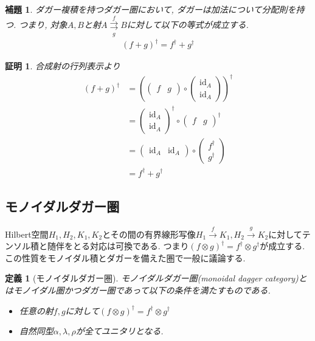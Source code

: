 \documentclass[a4paper,12pt]{ltjsarticle}
\theoremstyle{break}
\newtheorem{defn}[thm]{定義}
\newtheorem{lem}[thm]{補題}
\newtheorem*{prf}{証明}
\newcommand{\xr}[1]{\xrightarrow{#1}}
\newcommand{\id}{\mathrm{id}}
\newcommand{\ci}{\circ}
\newcommand{\al}{\alpha}
\newcommand{\la}{\lambda}
\newcommand{\da}{\dagger}
\newcommand{\ot}{\otimes}
\numberwithin{equation}{section}
\begin{document}
\begin{lem}
  ダガー複積を持つダガー圏において, ダガーは加法について分配則を持つ. 
  つまり, 対象$A,B$と射$A \overset{f}{\underset{g}{\rightrightarrows}} B$に対して以下の等式が成立する.
  \begin{align*}
    (f+g)^\da = f^\da + g^\da
  \end{align*}
\end{lem}

\begin{prf}
  合成射の行列表示より
  \begin{align*}
    (f+g)^\da
    &= \left( 
      \begin{pmatrix}
      f & g
    \end{pmatrix} \ci 
    \begin{pmatrix}
      \id_A \\
      \id_A
    \end{pmatrix}\right)^\da \\
    &= \begin{pmatrix}
      \id_A \\
      \id_A
    \end{pmatrix}^\da
    \ci \begin{pmatrix}
      f & g
    \end{pmatrix}^\da \\
    &= \begin{pmatrix}
      \id_A & \id_A
    \end{pmatrix} \ci 
    \begin{pmatrix}
      f^\da \\
      g^\da
    \end{pmatrix} \\
    &= f^\da + g^\da
  \end{align*}
\end{prf}

\subsection{モノイダルダガー圏}

Hilbert空間$H_1,H_2,K_1,K_2$とその間の有界線形写像$H_1 \xr{f} K_1, H_2 \xr{g} K_2$に対してテンソル積と随伴をとる対応は可換である. 
つまり$(f \ot g)^\da = f^\da \ot g^\da$が成立する. 
この性質をモノイダル積とダガーを備えた圏で一般に議論する. 

\begin{defn}[モノイダルダガー圏]
  モノイダルダガー圏(monoidal dagger category)とはモノイダル圏かつダガー圏であって以下の条件を満たすものである. 
  \begin{itemize}
    \item 任意の射$f,g$に対して$(f \ot g)^\da = f^\da \ot g^\da$
    \item 自然同型$\al, \la, \rho$が全てユニタリとなる. 
  \end{itemize}
\end{defn}
\end{document}
